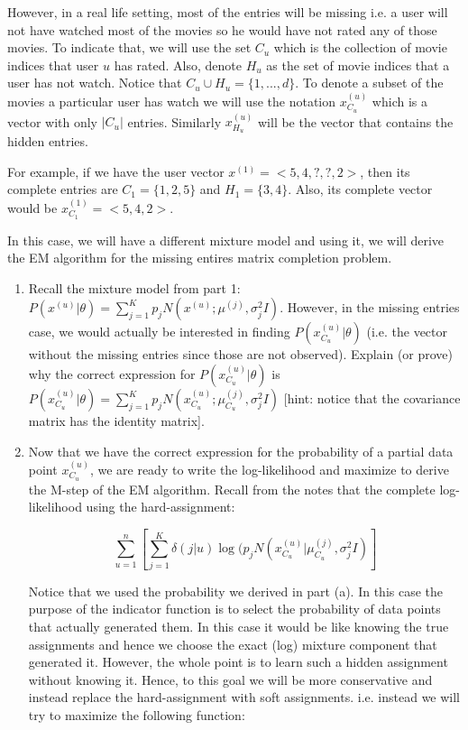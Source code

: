 \begin{enumerate}
However, in a real life setting, most of the entries will be missing i.e. a user will not have watched most of the movies so he would have not rated any of those movies. To indicate that, we will use the set $C_{u}$ which is the collection of movie indices that user $u$ has rated. Also, denote $H_{u}$ as the set of movie indices that a user has not watch. Notice that $C_{u} \cup H_{u} = \{1, ... , d \}$. To denote a subset of the movies a particular user has watch we will use the notation $x^{(u)}_{C_u}$ which is a vector with only $|C_u|$ entries. Similarly $x^{(u)}_{H_u}$ will be the vector that contains the hidden entries.

For example, if we have the user vector $x^{(1)} = < 5, 4, ?, ?, 2>$, then its complete entries are $C_{1} = \{ 1, 2, 5\}$ and $H_{1} = \{ 3, 4\}$. Also, its complete vector would be $x^{(1)}_{C_1} = < 5, 4, 2>$.

In this case, we will have a different mixture model and using it, we will derive the EM algorithm for the missing entires matrix completion problem.

\begin{enumerate}

\item Recall the mixture model from part 1: $P(x^{(u)} | \theta) = \sum^{K}_{j=1} p_j N(x^{(u)}; \mu^{(j)}, \sigma^2_j I) $. However, in the missing entries case, we would actually be interested in finding $P(x^{(u)}_{C_u} | \theta)$ (i.e. the vector without the missing entries since those are not observed). Explain (or prove) why the correct expression for $P(x^{(u)}_{C_u} | \theta)$ is$P(x^{(u)}_{C_u}  | \theta) = \sum^{K}_{j=1} p_j N(x^{(u)}_{C_u} ; \mu^{(j)}_{C_u} , \sigma^2_j I) $ [hint: notice that the covariance matrix has the identity matrix].

\item Now that we have the correct expression for the probability of a  partial data point $x^{(u)}_{C_u}$, we are ready to write the log-likelihood and maximize to derive the M-step of the EM algorithm. Recall from the notes that the complete log-likelihood using the hard-assignment:

$$ \sum^n_{u=1} \left[ \sum^{K}_{j=1} \delta(j|u) \log( p_j N(x^{(u)}_{C_u} | \mu^{(j)}_{C_u}, \sigma^2_j I) \right]$$

Notice that we used the probability we derived in part (a). In this case the purpose of the indicator function is to select the probability of data points that actually generated them. In this case it would be like knowing the true assignments and hence we choose the exact (log) mixture component that generated it. However, the whole point is to learn such a hidden assignment without knowing it. Hence, to this goal we will be more conservative and instead replace the hard-assignment with soft assignments. i.e. instead we will try to maximize the following function:


\end{enumerate}
\end{enumerate}
